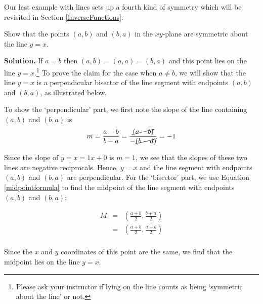 \documentclass{ximera}
\begin{document}

\label{inversemidpoint}

Our last example with lines sets up a fourth kind of symmetry which will be revisited in Section \ref{InverseFunctions}.  

\begin{example} \label{inversemidpointex2} Show that the points $(a,b)$ and $(b,a)$ in the $xy$-plane are symmetric about the line $y = x$.  

 

{\bf Solution.}  If $a = b$ then $(a, b) = (a, a) = (b, a)$ and this point lies on the line $y = x$.\footnote{Please ask your instructor if lying on the line counts as being `symmetric about the line' or not.}  To prove the claim for the case when $a \neq b$, we will show that the line $y = x$ is a perpendicular bisector of the line segment with endpoints $(a,b)$ and $(b,a)$, as illustrated below.

\begin{center}
\end{center}

To show the `perpendicular' part,  we first note the slope of the line containing $(a,b)$ and $(b,a)$ is \[ m= \frac{a-b}{b-a} = \frac{\cancel{(a-b)}}{-\cancel{(b-a)}} = -1\]

Since the slope of $y = x = 1x + 0$ is $m = 1$,  we see that the slopes of these two lines are negative reciprocals.  Hence, $y=x$ and the line segment with endpoints $(a,b)$ and $(b,a)$ are perpendicular.  For the `bisector' part, we use Equation \ref{midpointformula} to find the midpoint of  the line segment with endpoints $(a,b)$ and $(b,a)$:


\[ \begin{array}{rcl}

 M & = & \left( \frac{a+b}{2},  \frac{b+a}{2} \right) \\
   & = & \left( \frac{a+b}{2},  \frac{a+b}{2} \right)  \\ \end{array} \]

Since the $x$ and $y$ coordinates of this point are the same, we find that the midpoint lies on the line $y=x$. 

\end{example}


\closegraphsfile
\end{document}
